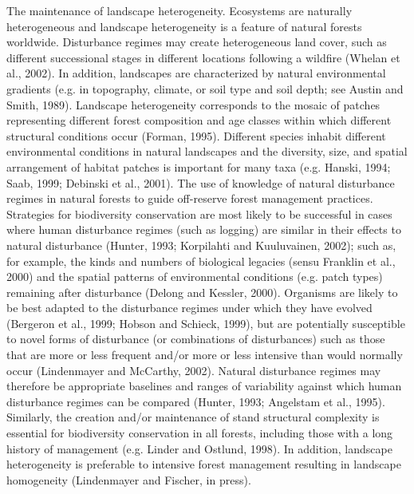 The maintenance of landscape heterogeneity. 
Ecosystems are naturally heterogeneous and landscape heterogeneity is a feature of natural forests worldwide. 
Disturbance regimes may create heterogeneous land cover, such as different successional stages in different locations following a wildfire (Whelan et al., 2002). 
In addition, landscapes are characterized by natural environmental gradients (e.g. in topography, climate, or soil type and soil depth; see Austin and Smith, 1989). 
Landscape heterogeneity corresponds to the mosaic of patches representing different forest composition and age classes within which different structural conditions occur (Forman, 1995). 
Different species inhabit different environmental conditions in natural landscapes and the diversity, size, and spatial arrangement of habitat patches is important for many taxa (e.g. Hanski, 1994; Saab, 1999; Debinski et al., 2001). 
The use of knowledge of natural disturbance regimes in natural forests to guide off-reserve forest management practices. Strategies for biodiversity conservation are most likely to be successful in cases where human disturbance regimes (such as logging) are similar in their effects to natural disturbance (Hunter, 1993; Korpilahti and Kuuluvainen, 2002); such as, for example, the kinds and numbers of biological legacies (sensu Franklin et al., 2000) and the spatial patterns of environmental conditions (e.g. patch types) remaining after disturbance (Delong and Kessler, 2000). 
Organisms are likely to be best adapted to the disturbance regimes under which they have evolved (Bergeron et al., 1999; Hobson and Schieck, 1999), but are potentially susceptible to novel forms of disturbance (or combinations of disturbances) such as those that are more or less frequent and/or more or less intensive than would normally occur (Lindenmayer and McCarthy, 2002). 
Natural disturbance regimes may therefore be appropriate baselines and ranges of variability against which human disturbance regimes can be compared (Hunter, 1993; Angelstam et al., 1995).
Similarly, the creation and/or maintenance of stand structural complexity is essential for biodiversity conservation in all forests, including those with a long history of management (e.g. Linder and Ostlund, 1998). 
In addition, landscape heterogeneity is preferable to intensive forest management resulting in landscape homogeneity (Lindenmayer and Fischer, in press).




